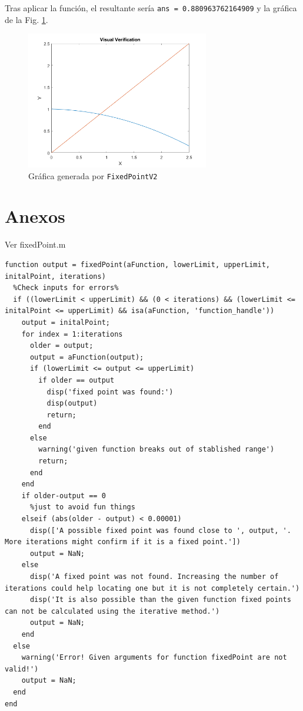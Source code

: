 \documentclass[spanish,notitlepage,letterpaper, 10pt]{article} %
\begin{document}
\begin{enumerate}
\begin{enumerate}
    Tras aplicar la función, el resultante sería \texttt{ans = 0.880963762164909} y la gráfica de la Fig. \ref{final}.
  

    \begin{figure}[H]
      \centering
      \includegraphics[width=8cm]{Images/fin.png}
      \caption{Gráfica generada por \texttt{FixedPointV2}}
      \label{final}
    \end{figure}
  
  \end{enumerate}

\end{enumerate}

\section{Anexos}

Ver fixedPoint.m
\begin{lstlisting}
function output = fixedPoint(aFunction, lowerLimit, upperLimit, initalPoint, iterations)
  %Check inputs for errors%
  if ((lowerLimit < upperLimit) && (0 < iterations) && (lowerLimit <= initalPoint <= upperLimit) && isa(aFunction, 'function_handle'))
    output = initalPoint;
    for index = 1:iterations
      older = output;
      output = aFunction(output);
      if (lowerLimit <= output <= upperLimit) 
        if older == output
          disp('fixed point was found:')
          disp(output)
          return;
        end
      else
        warning('given function breaks out of stablished range')
        return;
      end
    end
    if older-output == 0
      %just to avoid fun things
    elseif (abs(older - output) < 0.00001)
      disp(['A possible fixed point was found close to ', output, '. More iterations might confirm if it is a fixed point.'])
      output = NaN;
    else
      disp('A fixed point was not found. Increasing the number of iterations could help locating one but it is not completely certain.')
      disp('It is also possible than the given function fixed points can not be calculated using the iterative method.')
      output = NaN;
    end
  else
    warning('Error! Given arguments for function fixedPoint are not valid!')
    output = NaN;
  end
end
\end{lstlisting}
\end{document}

